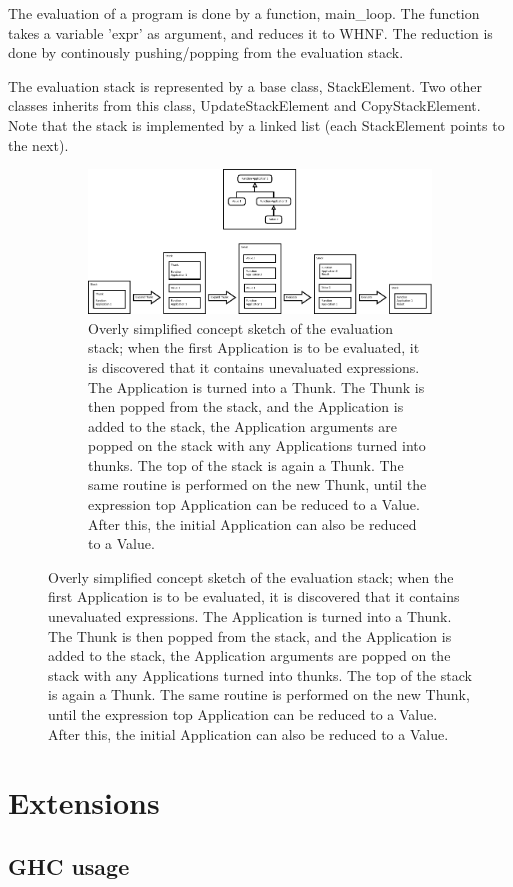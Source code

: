 The evaluation of a program is done by a function, main\_loop. The function
takes a variable 'expr' as argument, and reduces it to WHNF. The reduction is done
by continously pushing/popping from the evaluation stack. 

The evaluation stack is represented by a base class, StackElement. Two other
classes inherits from this class, UpdateStackElement and CopyStackElement. Note that
the stack is implemented by a linked list (each StackElement points to the next).

\begin{figure}
\begin{figure}[H]
\centering
\includegraphics[width=\textheight]{../diags/eval-stack.pdf}

\caption{Overly simplified concept sketch of the evaluation stack; 
when the first Application is to be evaluated, it is discovered that it
contains unevaluated expressions. The Application is turned into a Thunk.
The Thunk is then popped from the stack, and the Application is added to
the stack, the Application arguments are popped on the stack with any 
Applications turned into thunks. The top of the stack is again a Thunk.
The same routine is performed on the new Thunk, until the expression top
Application can be reduced to a Value. After this, the initial Application
can also be reduced to a Value.
}
\label{fig:classdia}

\end{figure}
\end{figure}

\section{Extensions}

\subsection{GHC usage}

